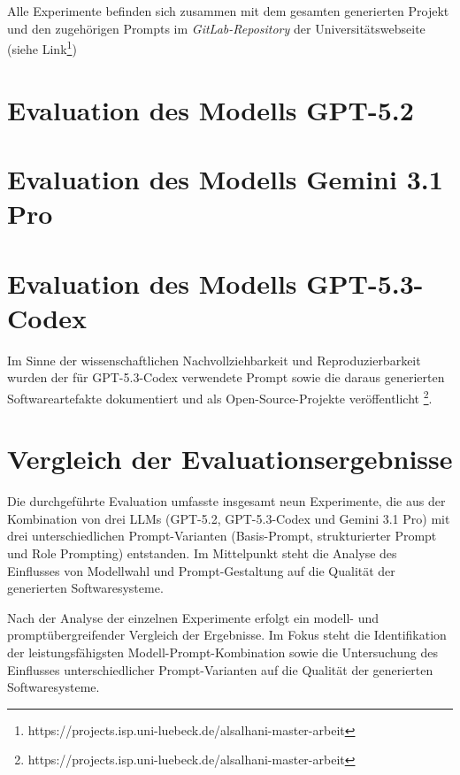 Alle Experimente befinden sich zusammen mit dem gesamten generierten Projekt und den zugehörigen Prompts im \textit{GitLab-Repository} der Universitätswebseite (siehe Link\footnote{https://projects.isp.uni-luebeck.de/alsalhani-master-arbeit})
\section{Evaluation des Modells GPT-5.2}




\newpage

\section{Evaluation des Modells Gemini 3.1 Pro}





\newpage
\section{Evaluation des Modells GPT-5.3-Codex}

Im Sinne der wissenschaftlichen Nachvollziehbarkeit und Reproduzierbarkeit wurden der für GPT-5.3-Codex verwendete Prompt sowie die daraus generierten Softwareartefakte dokumentiert und als Open-Source-Projekte veröffentlicht \footnote{https://projects.isp.uni-luebeck.de/alsalhani-master-arbeit}.





%
\newpage
\section{Vergleich der Evaluationsergebnisse}

Die durchgeführte Evaluation umfasste insgesamt neun Experimente, die aus der Kombination von drei LLMs (GPT-5.2, GPT-5.3-Codex und Gemini 3.1 Pro) mit drei unterschiedlichen Prompt-Varianten (Basis-Prompt, strukturierter Prompt und Role Prompting) entstanden. Im Mittelpunkt steht die Analyse des Einflusses von Modellwahl und Prompt-Gestaltung auf die Qualität der generierten Softwaresysteme.

Nach der Analyse der einzelnen Experimente erfolgt ein modell- und promptübergreifender Vergleich der Ergebnisse. Im Fokus steht die Identifikation der leistungsfähigsten Modell-Prompt-Kombination sowie die Untersuchung des Einflusses unterschiedlicher Prompt-Varianten auf die Qualität der generierten Softwaresysteme.

